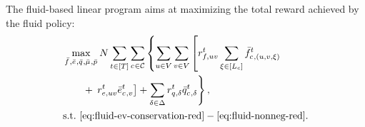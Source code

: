 The fluid-based linear program aims at maximizing the total reward achieved by the fluid policy:
{
\begin{align*}
    &\max_{\lptripfulfill{}{}, \lpreroute{}{}, \lpcharge{}{}, \lpslack{}{}, \lppass{}{}}  \Size \sum_{\time \in [\Horizon]}^{} \sum_{\cartype{} \in \Cartype} \left\{ \sum_{\origin \in \Region} \sum_{\destination \in \Region} \left[ \tripfulfillreward{,\origin\destination}{\time} \sum_{\tripactivetime \in [\Lc]}^{} \lptripfulfill{\cartype{}, (\origin, \destination, \tripactivetime)}{\time}   \right.\right. \nonumber\\
    &\qquad+ \left.\left. \reroutingreward{,\origin\destination}{\time} \lpreroute{\cartype{}, \destination}{\time} \right] + \sum_{\type \in \Type} \chargingreward{,\type}{\time} \lpcharge{\cartype{}, \type}{\time} \right\}, \notag \\%
    &\text{s.t.} \  \eqref{eq:fluid-ev-conservation-red}-\eqref{eq:fluid-nonneg-red}.
\end{align*}
}


